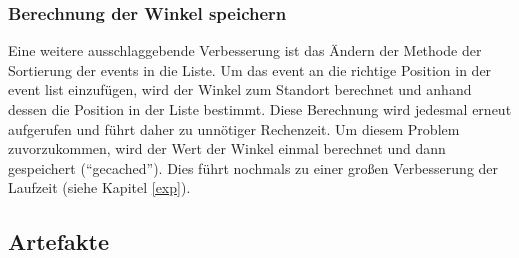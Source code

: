 \subsubsection{Berechnung der Winkel speichern}

Eine weitere ausschlaggebende Verbesserung ist das Ändern der Methode der Sortierung der events in die Liste. Um das event an die richtige Position 
in der event list einzufügen, wird der Winkel zum Standort berechnet und anhand dessen die Position in der Liste bestimmt. Diese Berechnung wird 
jedesmal erneut aufgerufen und führt daher zu unnötiger Rechenzeit. Um diesem Problem zuvorzukommen, wird der Wert der Winkel einmal berechnet und 
dann gespeichert (``gecached''). Dies führt nochmals zu einer großen Verbesserung der Laufzeit (siehe Kapitel \ref{exp}).

\subsection{Artefakte}


